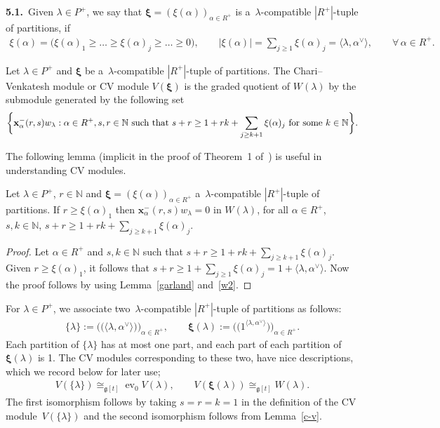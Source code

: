 \documentclass[pdftex]{sigma}
\DeclareMathOperator{\ev}{ev}
\numberwithin{equation}{section}
\begin{document}
{\bf 5.1.}~Given $\lambda\in P^{+}$, we say that $\pmb{\xi}=(\xi(\alpha))_{\alpha\in R^+}$ is a~$\lambda$-compatible
$|R^{+}|$-tuple of partitions, if
\begin{gather*}
\xi(\alpha)=\big(\xi(\alpha)_1\geq\dots \geq\xi(\alpha)_j\geq\dots\geq 0\big),
\qquad
|\xi(\alpha)|= \sum\limits_{j\geq 1}\xi(\alpha)_j = \langle \lambda, \alpha^{\vee} \rangle,
\qquad
\forall\, \alpha \in R^+.
\end{gather*}
\begin{definition} Let $\lambda\in P^{+}$ and $\pmb{\xi}$ be a~$\lambda$-compatible $|R^{+}|$-tuple of partitions.
The Chari--Venkatesh module or CV module $V(\pmb\xi)$ is the graded quotient of $W(\lambda)$ by the submodule generated
by the following set
\begin{gather*}
\bigg\{\mathbf{x}^{-}_{\alpha}(r,s)w_{\lambda}: \alpha\in R^+, s, r \in \mathbb{N}~\textup{such that}~s+r\geq
1+rk+\sum\limits_{j\geq k+1} \xi(\alpha)_j~\textup{for some}~k\in \mathbb{N}\bigg\}.
\end{gather*}
\end{definition}

The following lemma (implicit in the proof of Theorem~1 of~\cite{CV}) is useful in understanding CV modules.
\begin{lemma}
\label{c-v}
Let $\lambda\in P^{+}$, $r\in\mathbb{N}$ and $\pmb\xi=(\xi(\alpha))_{\alpha\in R^+}$ a~$\lambda$-compatible
$|R^{+}|$-tuple of partitions.
If $r\geq \xi(\alpha)_1$ then $\mathbf{x}^{-}_{\alpha}(r,s)w_{\lambda}=0$ in $W(\lambda)$, for all $\alpha\in R^+$,
$s, k \in \mathbb{N}$, $s+r\geq 1+rk+\sum\limits_{j\geq k+1} \xi(\alpha)_j$.
\end{lemma}
\begin{proof}
Let $\alpha\in R^+$ and $s, k \in \mathbb{N}$ such that $s+r\geq 1+rk+\sum\limits_{j\geq k+1} \xi(\alpha)_j$. Given
$r\geq \xi(\alpha)_1$, it follows that $s+r \geq 1 + \sum\limits_{j\geq 1} \xi(\alpha)_j=1+\langle \lambda,
\alpha^{\vee} \rangle$.
Now the proof follows by using Lemma~\ref{garland} and~\eqref{w2}.
\end{proof}

For $\lambda\in P^{+}$, we associate two~$\lambda$-compatible $|R^{+}|$-tuple of partitions as follows:
\begin{gather*}
\{\lambda\}:=\big(\big(\langle \lambda, \alpha^{\vee} \rangle\big)\big)_{\alpha\in R^{+}},
\qquad
\pmb\xi(\lambda):=\big(\big(1^{\langle \lambda, \alpha^{\vee} \rangle}\big)\big)_{\alpha\in R^+}.
\end{gather*}
Each partition of $\{\lambda\}$ has at most one part, and each part of each partition of $\pmb\xi(\lambda)$ is 1.
The CV modules corresponding to these two, have nice descriptions, which we record below for later use;
\begin{gather}
\label{e1}
V(\{\lambda\})\cong_{\mathfrak{g}[t]} \ev_0 V(\lambda),
\qquad
V(\pmb\xi(\lambda)) \cong_{\mathfrak{g}[t]} W(\lambda).
\end{gather}
The f\/irst isomorphism follows by taking $s=r=k=1$ in the def\/inition of the CV mo\-du\-le~$V(\{\lambda\})$ and the second
isomorphism follows from Lemma~\ref{c-v}.
\end{document}
